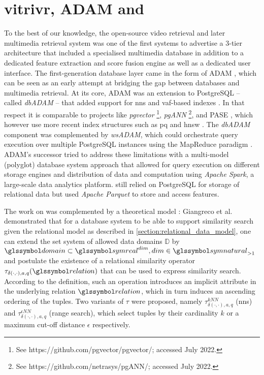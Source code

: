\section{vitrivr, ADAM and \texorpdfstring{\adampro{}}{ADAMpro}}
\label{section:vitrivr_adam_adampro}
To the best of our knowledge, the open-source \vitrivr{} video retrieval \cite{Rossetto:2016Vitrivr} and later multimedia retrieval \cite{Gasser:2019Multimodal} system was one of the first systems to advertise a 3-tier architecture that included a specialised multimedia database in addition to a dedicated feature extraction and score fusion engine as well as a dedicated user interface. The first-generation database layer came in the form of ADAM \cite{Giangreco:2014Adam}, which can be seen as an early attempt at bridging the gap between databases and multimedia retrieval. At its core, ADAM was an extension to PostgreSQL -- called \emph{dbADAM} -- that added support for \acrshort{nns} and \acrshort{vaf}-based indexes \cite{Weber:1998Va}. In that respect it is comparable to projects like \emph{pgvector} \footnote{See https://github.com/pgvector/pgvector/; accessed July 2022.}, \emph{pgANN} \footnote{See https://github.com/netrasys/pgANN/; accessed July 2022.}, and PASE \cite{Yang:2020Pase}, which however use more recent index structures such as \acrshort{pq} \cite{Jegou:2010Product} and \acrshort{hnsw} \cite{Malkov:2018Efficient}. The \emph{dbADAM} component was complemented by \emph{wsADAM}, which could orchestrate query execution over multiple PostgreSQL instances using the MapReduce paradigm \cite{Dean:2008Mapreduce}. ADAM's successor \adampro{} \cite{Giangreco:2016Adam} tried to address these limitations with a multi-model (polyglot) database system approach that allowed for query execution on different storage engines and distribution of data and computation using \emph{Apache Spark}, a large-scale data analytics platform. \adampro{} still relied on PostgreSQL for storage of relational data but used \emph{Apache Parquet} to store and access features. 

The work on \adampro{} was complemented by a theoretical model \cite{Giangreco:2018Database}: Giangreco et al. demonstrated that for a database system to be able to support similarity search given the relational model as described in \cref{section:relational_data_model}, one can extend the set system of allowed data domains $\mathbb{D}$ by $\domain \subset \symreal^{dim}, dim \in \symnatural_{>1}$ and postulate the existence of a relational similarity operator $\tau_{\delta(\cdot,\cdot),a,q}(\relation)$ that can be used to express similarity search. According to the definition, such an operation introduces an implicit attribute in the underlying relation $\relation$, which in turn induces an ascending ordering of the tuples. Two variants of $\tau$ were proposed, namely $\tau^{kNN}_{\delta(\cdot,\cdot),a,q}$ (\acrshort{nns}) and $\tau^{\epsilon NN}_{\delta(\cdot,\cdot),a,q}$ (range search), which select tuples by their cardinality $k$ or a maximum cut-off distance $\epsilon$ respectively.

